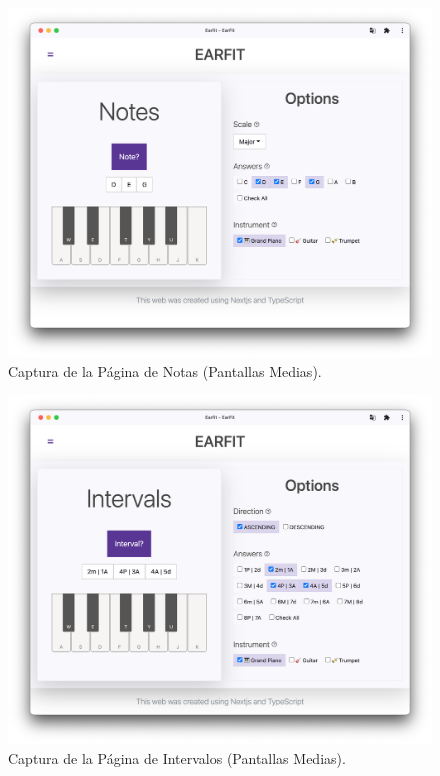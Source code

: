 \documentclass[12pt,twoside,titlepage]{report}
\begin{document}
{\begin{figure}[H]
    \centering
    \includegraphics[scale=0.3]{Capturas Earfit/Tablet/Notes}
    \caption{Captura de la Página de Notas (Pantallas Medias).}
    \label{fig:TabletNotes}
\end{figure}

\begin{figure}[H]
    \centering
    \includegraphics[scale=0.3]{Capturas Earfit/Tablet/Intervals}
    \caption{Captura de la Página de Intervalos (Pantallas Medias).}
    \label{fig:TabletIntervals}
\end{figure}

}
\end{document}
